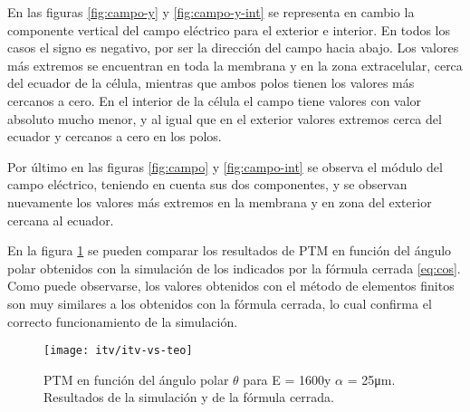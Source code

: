 En las figuras \ref{fig:campo-y} y \ref{fig:campo-y-int} se representa en cambio la componente vertical del campo eléctrico para el exterior e interior. En todos los casos el signo es negativo, por ser la dirección del campo hacia abajo. Los valores más extremos se encuentran en toda la membrana y en la zona extracelular, cerca del ecuador de la célula, mientras que ambos polos tienen los valores más cercanos a cero. En el interior de la célula el campo tiene valores con valor absoluto mucho menor, y al igual que en el exterior valores extremos cerca del ecuador y cercanos a cero en los polos.


Por último en las figuras \ref{fig:campo} y \ref{fig:campo-int} se observa el módulo del campo eléctrico, teniendo en cuenta sus dos componentes, y se observan nuevamente los valores más extremos en la membrana y en zona del exterior cercana al ecuador.

En la figura \ref{fig:itv-vs-teo} se pueden comparar los resultados de PTM en función del ángulo polar obtenidos con la simulación de los indicados por la fórmula cerrada \ref{eq:cos}. Como puede observarse, los valores obtenidos con el método de elementos finitos son muy similares a los obtenidos con la fórmula cerrada, lo cual confirma el correcto funcionamiento de la simulación. 

\clearpage






\begin{figure}
	\texttt{[image: itv/itv-vs-teo]}
	\caption{PTM en función del ángulo polar $\theta$ para E = 1600\vcm y $\alpha$ = 25\si{\micro\metre}. Resultados de la simulación y de la fórmula cerrada.}
	\label{fig:itv-vs-teo}
\end{figure}

